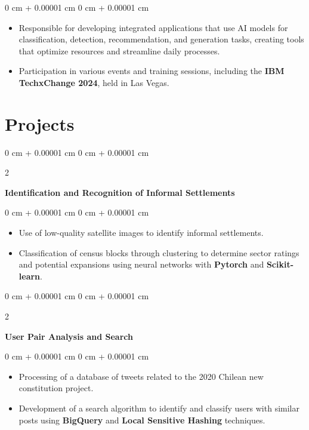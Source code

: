 \documentclass[10pt, letterpaper]{article}
\newenvironment{highlights}{
    \begin{itemize}[
        topsep=0.10 cm,
        parsep=0.10 cm,
        partopsep=0pt,
        itemsep=0pt,
        leftmargin=0 cm + 10pt
    ]
}{
    \end{itemize}
} %
\newenvironment{onecolentry}{
    \begin{adjustwidth}{
        0 cm + 0.00001 cm
    }{
        0 cm + 0.00001 cm
    }
}{
    \end{adjustwidth}
} %
\newenvironment{twocolentry}[2][]{
    \onecolentry
    \def\secondColumn{#2}
    \setcolumnwidth{\fill, 4.5 cm}
    \begin{paracol}{2}
}{
    \switchcolumn \raggedleft \secondColumn
    \end{paracol}
    \endonecolentry
} %
\begin{document}
\vspace{0.10 cm}
\begin{onecolentry}
    \begin{highlights}
        \item Responsible for developing integrated applications that use AI models for classification, detection, recommendation, and generation tasks, creating tools that optimize resources and streamline daily processes.
        \item Participation in various events and training sessions, including the \textbf{IBM TechxChange 2024}, held in Las Vegas.
    \end{highlights}
\end{onecolentry}

\section{Projects}

\begin{twocolentry}{
}
    \textbf{Identification and Recognition of Informal Settlements}
\end{twocolentry}

\vspace{0.10 cm}
\begin{onecolentry}
    \begin{highlights}
    \item Use of low-quality satellite images to identify informal settlements.
    \item Classification of census blocks through clustering to determine sector ratings and potential expansions using neural networks with \textbf{Pytorch} and \textbf{Scikit-learn}.
    \end{highlights}
\end{onecolentry}
\vspace{0.2 cm}
\begin{twocolentry}{
}

    \textbf{User Pair Analysis and Search}
\end{twocolentry}

\vspace{0.10 cm}
\begin{onecolentry}
    \begin{highlights}
    \item Processing of a database of tweets related to the 2020 Chilean new constitution project.
    \item Development of a search algorithm to identify and classify users with similar posts using \textbf{BigQuery} and \textbf{Local Sensitive Hashing} techniques.
    \end{highlights}
\end{onecolentry}
\vspace{0.2 cm}
\end{document}
